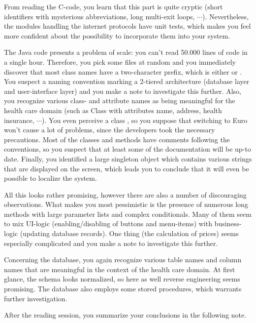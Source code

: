 \documentclass[a4paper,10pt,twoside]{book}
\begin{document}
From reading the C-code, you learn that this part is quite cryptic (short identifiers with mysterious abbreviations, long multi-exit loops, $\cdots$). Nevertheless, the modules handling the internet protocols have unit tests, which makes you feel more confident about the possibility to incorporate them into your system.

The Java code presents a problem of scale: you can't read 50.000 lines of code in a single hour. Therefore, you pick some files at random and you immediately discover that most class names have a two-character prefix, which is either  or . You suspect a naming convention marking a 2-tiered architecture (database layer and user-interface layer) and you make a note to investigate this further. Also, you recognize various class- and attribute names as being meaningful for the health care domain (such as Class  with attributes name, address, health insurance, $\cdots$). You even perceive a class , so you suppose that switching to Euro won't cause a lot of problems, since the developers took the necessary precautions. Most of the classes and methods have comments following the  conventions, so you suspect that at least some of the documentation will be up-to date. Finally, you identified a large singleton object which contains various strings that are displayed on the screen, which leads you to conclude that it will even be possible to localize the system.

All this looks rather promising, however there are also a number of discouraging observations. What makes you most pessimistic is the presence of numerous long methods with large parameter lists and complex conditionals. Many of them seem to mix UI-logic (enabling/disabling of buttons and menu-items) with business-logic (updating database records). One thing (the calculation of prices) seems especially complicated and you make a note to investigate this further.

Concerning the database, you again recognize various table names and column names that are meaningful in the context of the health care domain. At first glance, the schema looks normalized, so here as well reverse engineering seems promising. The database also employs some stored procedures, which warrants further investigation.

After the reading session, you summarize your conclusions in the following note.
\end{document}
